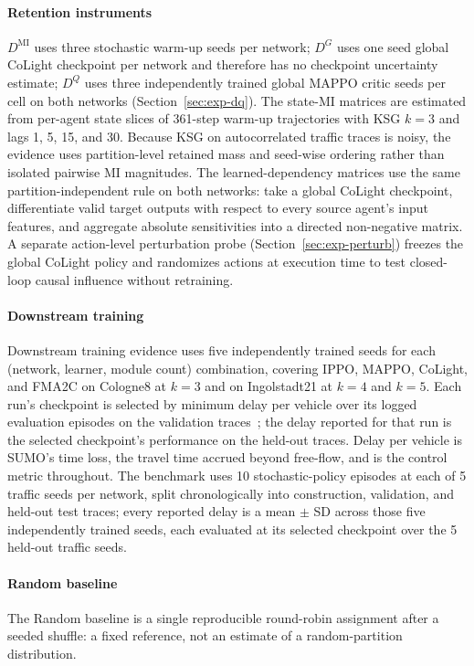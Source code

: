 \documentclass[journal]{IEEEtran}
\theoremstyle{definition}
\begin{document}
\paragraph{Retention instruments}
$D^{\mathrm{MI}}$ uses three stochastic warm-up seeds per network; $D^G$ uses one seed global CoLight checkpoint per network and therefore has no checkpoint uncertainty estimate; $D^Q$ uses three independently trained global MAPPO critic seeds per cell on both networks (Section~\ref{sec:exp-dq}). The state-MI matrices are estimated from per-agent state slices of 361-step warm-up trajectories with KSG $k=3$ and lags 1, 5, 15, and 30. Because KSG on autocorrelated traffic traces is noisy, the evidence uses partition-level retained mass and seed-wise ordering rather than isolated pairwise MI magnitudes. The learned-dependency matrices use the same partition-independent rule on both networks: take a global CoLight checkpoint, differentiate valid target outputs with respect to every source agent's input features, and aggregate absolute sensitivities into a directed non-negative matrix. A separate action-level perturbation probe (Section~\ref{sec:exp-perturb}) freezes the global CoLight policy and randomizes actions at execution time to test closed-loop causal influence without retraining.

\paragraph{Downstream training}
Downstream training evidence uses five independently trained seeds for each (network, learner, module count) combination, covering IPPO, MAPPO, CoLight, and FMA2C on Cologne8 at $k=3$ and on Ingolstadt21 at $k=4$ and $k=5$. Each run's checkpoint is selected by minimum delay per vehicle over its logged evaluation episodes on the validation traces~\citep{henderson2018matters,agarwal2021rliable}; the delay reported for that run is the selected checkpoint's performance on the held-out traces. Delay per vehicle is SUMO's time loss, the travel time accrued beyond free-flow, and is the control metric throughout. The benchmark uses 10 stochastic-policy episodes at each of 5 traffic seeds per network, split chronologically into construction, validation, and held-out test traces; every reported delay is a mean $\pm$ SD across those five independently trained seeds, each evaluated at its selected checkpoint over the 5 held-out traffic seeds.

\paragraph{Random baseline}
The Random baseline is a single reproducible round-robin assignment after a seeded shuffle: a fixed reference, not an estimate of a random-partition distribution.
\end{document}
